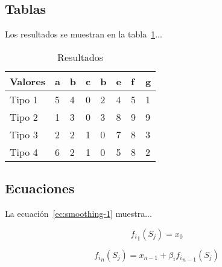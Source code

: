 

\subsection{Tablas}

Los resultados se muestran en la tabla~\ref{table:resultados}...

\begin{table}[htbp!]
\begin{center}
\begin{tabular}{|l|l|l|l|l|l|l|l|}
\hline
Valores    & a & b & c & b & e  & f & g \\
\hline
Tipo 1     & 5 & 4 & 0 & 2 &  4 & 5 &  1  \\
Tipo 2     & 1 & 3 & 0 & 3 &  8 & 9 &  9  \\
Tipo 3     & 2 & 2 & 1 & 0 &  7 & 8 &  3  \\
Tipo 4     & 6 & 2 & 1 & 0 &  5 & 8 &  2  \\
\hline
\end{tabular}
\end{center}
\caption{Resultados\label{table:resultados}}
\end{table}

\subsection{Ecuaciones}

La ecuación~\ref{ec:smoothing-1} muestra...

\begin{equation} \label{ec:smoothing-1}
 {f_i}_1 (S_j) = x_{0}
\end{equation} 


\begin{equation} \label{ec:smoothing-2}
 {f_i}_n (S_j) =  x_{n-1} + \beta_i {f_i}_{n-1} (S_j)
\end{equation} 
